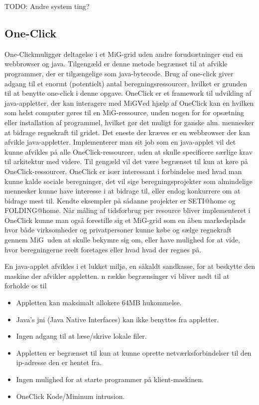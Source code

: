 \documentclass[draft,a4paper,10pt]{article}
\newcommand{\mig}{MiG}
\newcommand{\oc}{One-Click}
\begin{document}
TODO: Andre system ting?

\subsection{\oc}\label{applet}
\oc muliggør deltagelse i et MiG-grid uden andre forudsætninger end en webbrowser og java. Tilgengæld er denne metode begrænset til at afvikle programmer, der er tilgængelige som java-bytecode. Brug af one-click giver adgang til et enormt (potentielt) antal beregningsressourcer, hvilket er grunden til at benytte one-click i denne opgave.
OneClick er et framework til udvikling af java-appletter, der kan interagere med \mig\. Ved hjælp af OneClick kan en hvilken som helst computer gøres til en \mig-ressource, unden nogen for for opsætning eller installation af programmel, hvilket gør det muligt for ganske alm. mennesker at bidrage regnekraft til gridet. Det eneste der kræves er en webbrowser der kan afvikle java-appletter. Implementerer man sit job som en java-applet vil det kunne afvikles på alle OneClick-ressourcer, uden at skulle specificere særlige krav til arkitektur med videre. Til gengæld vil det være begrænset til kun at køre på OneClick-ressourcer. 
OneClick er især interessant i forbindelse med hvad man kunne kalde sociale beregninger, det vil sige beregningsprojekter som almindelige mennesker kunne have interesse i at bidrage til, eller endog konkurrere om at bidrage mest til. Kendte eksempler på sådanne projekter er SETI@home og FOLDING@home. Når måling af tidsforbrug per resource bliver implementeret i OneClick kunne man også  forestille sig et \mig-grid som en åben markedsplads hvor både virksomheder og privatpersoner kunne købe og sælge regnekraft gennem \mig\ uden at skulle bekymre sig om, eller have mulighed for at vide, hvor beregningerne reelt foretages eller hvad hvad der regnes på. 


En java-applet afvikles i et lukket miljø, en såkaldt sandkasse, for at beskytte den maskine der afvikler appletten. n række begrænsinger vi bliver nødt til at forholde os til
\begin{itemize}
	\item Appletten kan maksimalt allokere 64MB hukommelse.
	\item Java's jni (Java Native Interfaces) kan ikke benyttes fra appletter. 
	\item Ingen adgang til at læse/skrive lokale filer.
	\item Appletten er begrænset til kun at kunne oprette netværksforbindelser til den ip-adresse den er hentet fra.
	\item Ingen mulighed for at starte programmer på klient-maskinen.
	\item OneClick Kode/Mininum intrusion.
\end{itemize}
\end{document}

